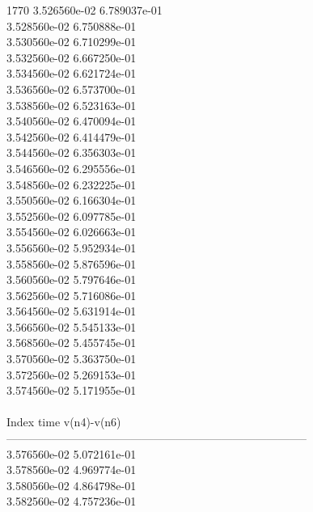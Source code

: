 1770	3.526560e-02	6.789037e-01	\\ 	3.528560e-02	6.750888e-01	\\ 	3.530560e-02	6.710299e-01	\\ 	3.532560e-02	6.667250e-01	\\ 	3.534560e-02	6.621724e-01	\\ 	3.536560e-02	6.573700e-01	\\ 	3.538560e-02	6.523163e-01	\\ 	3.540560e-02	6.470094e-01	\\ 	3.542560e-02	6.414479e-01	\\ 	3.544560e-02	6.356303e-01	\\ 	3.546560e-02	6.295556e-01	\\ 	3.548560e-02	6.232225e-01	\\ 	3.550560e-02	6.166304e-01	\\ 	3.552560e-02	6.097785e-01	\\ 	3.554560e-02	6.026663e-01	\\ 	3.556560e-02	5.952934e-01	\\ 	3.558560e-02	5.876596e-01	\\ 	3.560560e-02	5.797646e-01	\\ 	3.562560e-02	5.716086e-01	\\ 	3.564560e-02	5.631914e-01	\\ 	3.566560e-02	5.545133e-01	\\ 	3.568560e-02	5.455745e-01	\\ 	3.570560e-02	5.363750e-01	\\ 	3.572560e-02	5.269153e-01	\\ 	3.574560e-02	5.171955e-01	\\ \hline
\\ \hline
Index   time            v(n4)-v(n6)     \\ \hline
--------------------------------------------------------------------------------\\ 	3.576560e-02	5.072161e-01	\\ 	3.578560e-02	4.969774e-01	\\ 	3.580560e-02	4.864798e-01	\\ 	3.582560e-02	4.757236e-01	\\ \hline
